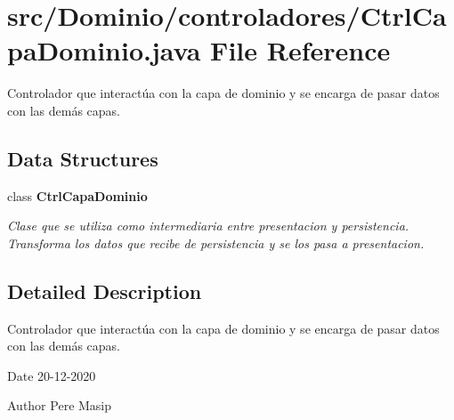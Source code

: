 \section{src/\+Dominio/controladores/\+Ctrl\+Capa\+Dominio.java File Reference}
\label{_ctrl_capa_dominio_8java}


Controlador que interactúa con la capa de dominio y se encarga de pasar datos con las demás capas.  


\subsection*{Data Structures}
\begin{DoxyCompactItemize}
\item 
class \textbf{ Ctrl\+Capa\+Dominio}
\begin{DoxyCompactList}\small\item\em Clase que se utiliza como intermediaria entre presentacion y persistencia. Transforma los datos que recibe de persistencia y se los pasa a presentacion. \end{DoxyCompactList}\end{DoxyCompactItemize}


\subsection{Detailed Description}
Controlador que interactúa con la capa de dominio y se encarga de pasar datos con las demás capas. 

\begin{DoxyDate}{Date}
20-\/12-\/2020 
\end{DoxyDate}
\begin{DoxyAuthor}{Author}
Pere Masip 
\end{DoxyAuthor}
